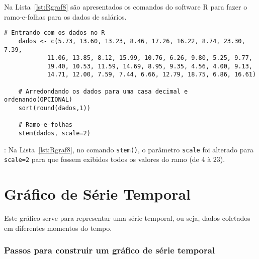 \documentclass[11pt,fleqn]{book} %
\begin{document}
\vspace{0.5cm}




Na Lista~\ref{lst:Rgraf8} são apresentados os comandos do software R para fazer o ramo-e-folhas para os dados de salários.  \\

\vspace{3cm}


\begin{scriptsize}
	\estiloR
	\begin{lstlisting}[caption={Comandos do software R}, label=lst:Rgraf8]
	# Entrando com os dados no R
	dados <- c(5.73, 13.60, 13.23, 8.46, 17.26, 16.22, 8.74, 23.30, 7.39,
			11.06, 13.85, 8.12, 15.99, 10.76, 6.26, 9.80, 5.25, 9.77,
			19.40, 10.53, 11.59, 14.69, 8.95, 9.35, 4.56, 4.00, 9.13,
			14.71, 12.00, 7.59, 7.44, 6.66, 12.79, 18.75, 6.86, 16.61)
	
	# Arredondando os dados para uma casa decimal e ordenando(OPCIONAL)
	sort(round(dados,1))
	
	# Ramo-e-folhas
	stem(dados, scale=2)

	\end{lstlisting}
\end{scriptsize}

: Na Lista~\ref{lst:Rgraf8}, no comando \texttt{stem()}, o parâmetro \texttt{scale} foi alterado para \texttt{scale=2} para que fossem exibidos todos os valores do ramo (de 4 à 23). \\



\section{Gráfico de Série Temporal}

Este gráfico serve para representar uma série temporal, ou seja, dados coletados em diferentes momentos do tempo. 

\subsubsection{Passos para construir um gráfico de série temporal}
\end{document}
